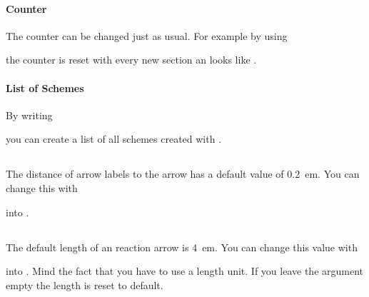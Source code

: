 \documentclass[toc=index,DIV10]{cnpkgdoc}
\begin{document}
\paragraph{Counter}
The counter can be changed just as usual. For example by using
\begin{beispiel}
 \makeatletter
 \makeatletter
 \renewcommand*\therxnscheme{\arabic{section}.\arabic{rxnscheme}}
\end{beispiel}
the counter is reset with every new section an looks like .

\paragraph{List of Schemes}
By writing
\begin{beschreibung}
\end{beschreibung}
you can create a list of all schemes created with .
\begin{beispiel}
\end{beispiel}

\subsection{}\label{ssec:setarrowlabel}
The distance of arrow labels to the arrow has a default value of \SI{0.2}{em}.
You can change this with
\begin{beschreibung}
\end{beschreibung}
into .
\begin{beispiel}
 \begin{rxn}
  \setarrowlabel{.5em}
 \end{rxn}
\end{beispiel}

\subsection{}\label{ssec:setarrowlength}
The default length of an reaction arrow is \SI{4}{em}. You can change this value
with
\begin{beschreibung}
\end{beschreibung}
into . Mind the fact that you have to use a length unit. If you
leave the argument empty the length is reset to default.
\end{document}

